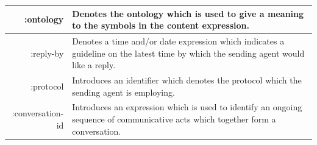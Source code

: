 \documentclass[main.tex]{subfiles}
\begin{document}
\begin{table}[htbp]
\begin{tabularx}{.8\textwidth}{>{\ttfamily}rX}
        :ontology                                                          & Denotes the ontology which is used to give a
        meaning to the symbols in the content expression.                                                                          \\\midrule
        :reply-by                                                          & Denotes a time and/or date expression which
        indicates a guideline on the latest time by which the
        sending agent would like a reply.                                                                                          \\\midrule
        :protocol                                                          & Introduces an identifier which denotes the protocol
        which the sending agent is employing.                                                                                      \\\midrule
        :conversation-id                                                   & Introduces an expression which is used to identify an
        ongoing sequence of communicative acts which
        together form a conversation.                                                                                              \\\bottomrule
    \end{tabularx}
    \label{message-parameters}
\end{table}
\end{document}
